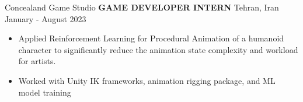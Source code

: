             
\begin{cventries}
    \cventry
    {Concealand Game Studio}
    {\textbf{GAME DEVELOPER INTERN}}
    {Tehran, Iran}
    {January - August 2023}
    {
        \begin{itemize}    
            \item Applied Reinforcement Learning for Procedural Animation of a humanoid character to significantly reduce the animation state complexity and workload for artists.
            \item Worked with Unity IK frameworks, animation rigging package, and ML model training
        \end{itemize}
    }
\end{cventries}

